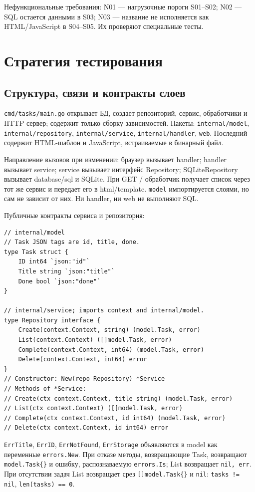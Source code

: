 \documentclass[12pt,a4paper]{extarticle}
\newcommand{\code}[1]{\nolinkurl{#1}}
\newcommand{\rucode}[1]{\texttt{#1}}
\newcommand{\mainsection}[1]{\clearpage\section{#1}}
\begin{document}
Нефункциональные требования: N01 --- нагрузочные пороги S01--S02;
N02 --- SQL остается данными в S03; N03 --- название не исполняется
как HTML/JavaScript в S04--S05. Их проверяют специальные тесты.

\mainsection{Стратегия тестирования}
\subsection{Структура, связи и контракты слоев}
\code{cmd/tasks/main.go} открывает БД, создает репозиторий, сервис,
обработчики и HTTP-сервер; содержит только сборку зависимостей.
Пакеты: \code{internal/model}, \code{internal/repository},
\code{internal/service}, \code{internal/handler}, \code{web}.
Последний содержит HTML-шаблон и JavaScript, встраиваемые в бинарный файл.

Направление вызовов при изменении: браузер вызывает handler;
handler вызывает service; service вызывает интерфейс Repository;
SQLiteRepository вызывает database/sql и SQLite.
При GET / обработчик получает список через тот же сервис и передает
его в html/template. \code{model} импортируется слоями, но сам
не зависит от них. Ни handler, ни web не выполняют SQL.

Публичные контракты сервиса и репозитория:
\begin{lstlisting}
// internal/model
// Task JSON tags are id, title, done.
type Task struct {
    ID int64 `json:"id"`
    Title string `json:"title"`
    Done bool `json:"done"`
}

// internal/service; imports context and internal/model.
type Repository interface {
    Create(context.Context, string) (model.Task, error)
    List(context.Context) ([]model.Task, error)
    Complete(context.Context, int64) (model.Task, error)
    Delete(context.Context, int64) error
}
// Constructor: New(repo Repository) *Service
// Methods of *Service:
// Create(ctx context.Context, title string) (model.Task, error)
// List(ctx context.Context) ([]model.Task, error)
// Complete(ctx context.Context, id int64) (model.Task, error)
// Delete(ctx context.Context, id int64) error
\end{lstlisting}

\code{ErrTitle}, \code{ErrID}, \code{ErrNotFound}, \code{ErrStorage}
объявляются в model как переменные \code{errors.New}.
При отказе методы, возвращающие Task, возвращают \rucode{model.Task\{\}}
и ошибку, распознаваемую \code{errors.Is}; List возвращает
\code{nil, err}. При отсутствии задач List возвращает срез \rucode{[]model.Task\{\}}
и \code{nil}: \code{tasks != nil}, \code{len(tasks) == 0}.
\end{document}
